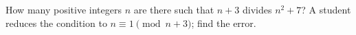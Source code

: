 How many positive integers $n$ are there such that $n+3$ divides $n^2+7$? A student reduces the condition to $n\equiv1\pmod{n+3}$; find the error.
